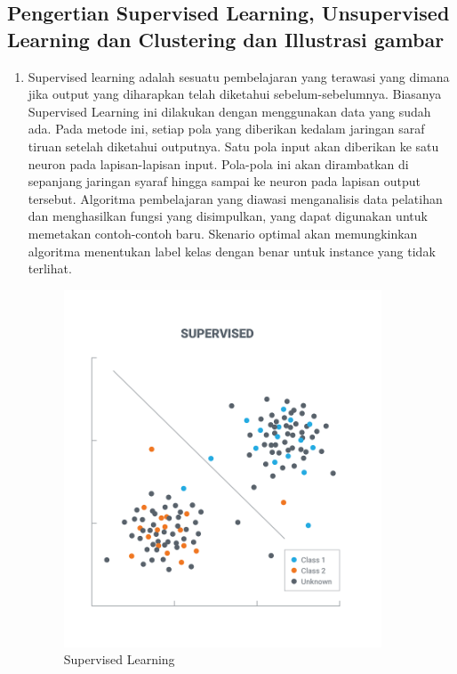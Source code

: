 \subsection{ Pengertian Supervised Learning, Unsupervised Learning dan Clustering dan Illustrasi gambar}
\begin{enumerate}
\item Supervised learning adalah sesuatu pembelajaran yang terawasi yang dimana jika output yang diharapkan telah diketahui sebelum-sebelumnya. Biasanya Supervised Learning ini dilakukan dengan menggunakan data yang sudah ada. Pada metode ini, setiap pola yang diberikan kedalam jaringan saraf tiruan setelah diketahui outputnya. Satu pola input akan diberikan ke satu neuron pada lapisan-lapisan input. Pola-pola ini akan dirambatkan di sepanjang jaringan syaraf hingga sampai ke neuron pada lapisan output tersebut. Algoritma pembelajaran yang diawasi menganalisis data pelatihan dan menghasilkan fungsi yang disimpulkan, yang dapat digunakan untuk memetakan contoh-contoh baru. Skenario optimal akan memungkinkan algoritma menentukan label kelas dengan benar untuk instance yang tidak terlihat.
\begin{figure}[ht]
\centering
\includegraphics[scale=0.5]{figures/2mrdt.png}
\caption{Supervised Learning}
\label{contoh}
\end{figure}


\end{enumerate}
